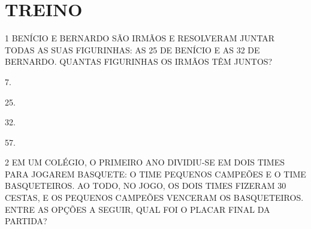












\section{TREINO}

\num{1} BENÍCIO E BERNARDO SÃO IRMÃOS E RESOLVERAM JUNTAR TODAS AS
SUAS FIGURINHAS: AS 25 DE BENÍCIO E AS 32 DE BERNARDO. QUANTAS FIGURINHAS OS
IRMÃOS TÊM JUNTOS?

\begin{escolha}
\item
  7.
\item
  25.
\item
  32.
\item
  57.
\end{escolha}

\num{2} EM UM COLÉGIO, O PRIMEIRO ANO DIVIDIU-SE EM DOIS TIMES PARA JOGAREM BASQUETE: O TIME PEQUENOS CAMPEÕES E O TIME BASQUETEIROS. AO TODO, NO JOGO, OS DOIS TIMES FIZERAM 30 CESTAS, E OS PEQUENOS CAMPEÕES VENCERAM OS BASQUETEIROS. ENTRE AS OPÇÕES A SEGUIR, QUAL FOI O PLACAR FINAL DA PARTIDA?

